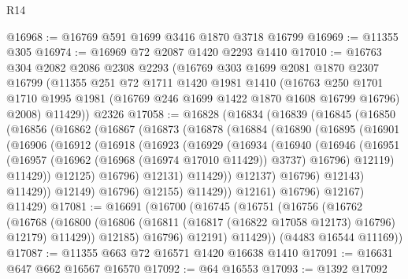 \begin{lexlean}{R14}
\begin{coremodule}
@16968 := @16769 @591 @1699 @3416 @1870 @3718 @16799
@16969 := @11355 @305
@16974 := @16969 @72 @2087 @1420 @2293 @1410
@17010 := @16763
    @304
    @2082
    @2086
    @2308
    @2293
    (@16769
      @303
      @1699
      @2081
      @1870
      @2307
      @16799
      (@11355
        @251
        @72
        @1711
        @1420
        @1981
        @1410
        (@16763
          @250
          @1701
          @1710
          @1995
          @1981
          (@16769 @246 @1699 @1422 @1870 @1608 @16799 @16796)
          @2008)
        @11429))
    @2326
@17058 := @16828
    (@16834
      (@16839
        (@16845
          (@16850
            (@16856
              (@16862
                (@16867
                  (@16873
                    (@16878
                      (@16884
                        (@16890
                          (@16895
                            (@16901
                              (@16906
                                (@16912
                                  (@16918
                                    (@16923
                                      (@16929
                                        (@16934
                                          (@16940
                                            (@16946
                                              (@16951
                                                (@16957
                                                  (@16962 (@16968 (@16974 @17010 @11429)) @3737)
                                                  @16796)
                                                @12119)
                                              @11429))
                                          @12125)
                                        @16796)
                                      @12131)
                                    @11429))
                                @12137)
                              @16796)
                            @12143)
                          @11429))
                      @12149)
                    @16796)
                  @12155)
                @11429))
            @12161)
          @16796)
        @12167)
      @11429)
@17081 := @16691
    (@16700
      (@16745
        (@16751
          (@16756
            (@16762
              (@16768
                (@16800 (@16806 (@16811 (@16817 (@16822 @17058 @12173) @16796) @12179) @11429))
                @12185)
              @16796)
            @12191)
          @11429))
      (@4483 @16544 @11169))
@17087 := @11355 @663 @72 @16571 @1420 @16638 @1410
@17091 := @16631 @647 @662 @16567 @16570
@17092 := @64 @16553
@17093 := @1392 @17092

\end{coremodule}
\end{lexlean}
